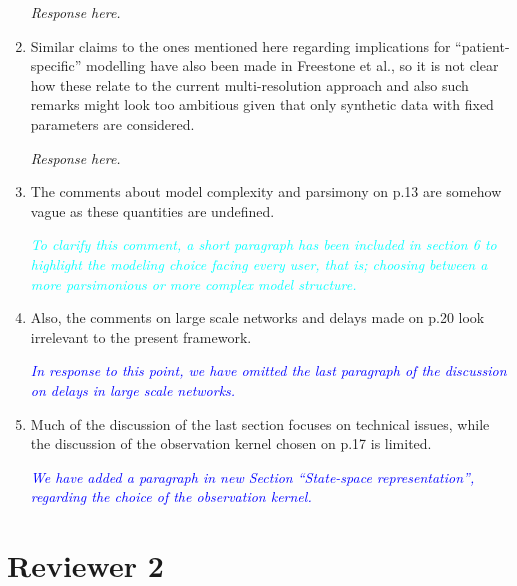 \documentclass{article}
\newcommand{\parham}[1]{\textcolor{blue}{#1}}
\newcommand{\ken}[1]{\textcolor{cyan}{#1}}
\begin{document}
\begin{enumerate}
\emph{Response here.}

				\item Similar claims to the ones mentioned here regarding  implications for ``patient-specific'' modelling have also been made in Freestone et al., so it is not clear how these relate to the current multi-resolution approach and also such remarks might look too ambitious given that only synthetic data with fixed parameters are considered.
				
				\emph{Response here.}
				
				\item The comments about model complexity and parsimony on p.13 are somehow vague as these quantities are undefined.
				
				
				\emph{\ken{To clarify this comment, a short paragraph has been included in section 6 to highlight the modeling choice facing every user, that is; choosing between a more parsimonious or more complex model structure.}}
				
				\item Also, the comments on large scale networks and delays made on p.20 look irrelevant to the present framework.
				
				\emph{\parham{In response to this point, we have omitted the last paragraph of the discussion on delays in large scale networks.}}
				
				\item Much of the discussion of the last section focuses on technical issues, while the discussion of the observation kernel chosen on p.17 is limited.
				
				\emph{\parham{We have added a paragraph in new Section ``State-space representation'', regarding the choice of the observation kernel.}}

    \end{enumerate}
    
    \section{Reviewer 2}
    
\end{document}
